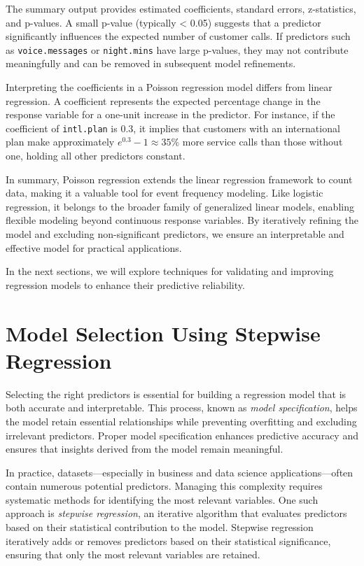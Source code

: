 \documentclass[
]{book}
\newcommand{\passthrough}[1]{#1}
\theoremstyle{definition}
\theoremstyle{definition}
\theoremstyle{definition}
\theoremstyle{definition}
\theoremstyle{remark}
\begin{document}
The summary output provides estimated coefficients, standard errors, z-statistics, and p-values. A small p-value (typically \textless{} 0.05) suggests that a predictor significantly influences the expected number of customer calls. If predictors such as \passthrough{\lstinline!voice.messages!} or \passthrough{\lstinline!night.mins!} have large p-values, they may not contribute meaningfully and can be removed in subsequent model refinements.

Interpreting the coefficients in a Poisson regression model differs from linear regression. A coefficient represents the expected percentage change in the response variable for a one-unit increase in the predictor. For instance, if the coefficient of \passthrough{\lstinline!intl.plan!} is 0.3, it implies that customers with an international plan make approximately \(e^{0.3} - 1 \approx 35\%\) more service calls than those without one, holding all other predictors constant.

In summary, Poisson regression extends the linear regression framework to count data, making it a valuable tool for event frequency modeling. Like logistic regression, it belongs to the broader family of generalized linear models, enabling flexible modeling beyond continuous response variables. By iteratively refining the model and excluding non-significant predictors, we ensure an interpretable and effective model for practical applications.

In the next sections, we will explore techniques for validating and improving regression models to enhance their predictive reliability.

\section{Model Selection Using Stepwise Regression}\label{sec-stepwise-regression}

Selecting the right predictors is essential for building a regression model that is both accurate and interpretable. This process, known as \emph{model specification}, helps the model retain essential relationships while preventing overfitting and excluding irrelevant predictors. Proper model specification enhances predictive accuracy and ensures that insights derived from the model remain meaningful.

In practice, datasets---especially in business and data science applications---often contain numerous potential predictors. Managing this complexity requires systematic methods for identifying the most relevant variables. One such approach is \emph{stepwise regression}, an iterative algorithm that evaluates predictors based on their statistical contribution to the model. Stepwise regression iteratively adds or removes predictors based on their statistical significance, ensuring that only the most relevant variables are retained.
\end{document}
